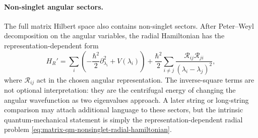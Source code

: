 \paragraph{Non-singlet angular sectors.}
The full matrix Hilbert space also contains non-singlet sectors.  After
Peter--Weyl decomposition on the angular variables, the radial Hamiltonian has
the representation-dependent form
\begin{equation}
  H_R'
  =
  \sum_i
  \left(
    -\frac{\hbar^2}{2}\partial_{\lambda_i}^2+V(\lambda_i)
  \right)
  +
  \frac{\hbar^2}{2}
  \sum_{i\ne j}
  \frac{\mathcal R_{ij}\mathcal R_{ji}}
       {(\lambda_i-\lambda_j)^2},
  \label{eq:matrix-qm-nonsinglet-radial-hamiltonian}
\end{equation}
where \(\mathcal R_{ij}\) act in the chosen angular representation.  The
inverse-square terms are not optional interpretation: they are the centrifugal
energy of changing the angular wavefunction as two eigenvalues approach.  A
later string or long-string comparison may attach additional language to
these sectors, but the intrinsic quantum-mechanical statement is simply the
representation-dependent radial problem
\eqref{eq:matrix-qm-nonsinglet-radial-hamiltonian}.

